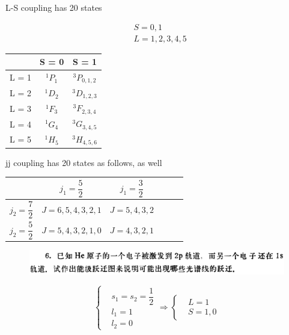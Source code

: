 \documentclass{article}
\begin{document}
L-S coupling has 20 states

\begin{equation*}
  \begin{aligned}
    & S = 0,1 \\
    & L = 1,2,3,4,5
  \end{aligned}
\end{equation*}

\begin{center}
\begin{tabular}{ c|cc } 
        & S = 0 & S = 1 \\
  \hline
  L = 1 & ${}^{1}P_{1}$ & ${}^{3}P_{0,1,2}$ \\ 
  L = 2 & ${}^{1}D_{2}$ & ${}^{3}D_{1,2,3}$ \\
  L = 3 & ${}^{1}F_{3}$ & ${}^{3}F_{2,3,4}$ \\
  L = 4 & ${}^{1}G_{4}$ & ${}^{3}G_{3,4,5}$ \\ 
  L = 5 & ${}^{1}H_{5}$ & ${}^{3}H_{4,5,6}$ \\ 
\end{tabular}
\end{center}

jj coupling has 20 states as follows, as well

\begin{center}
\begin{tabular}{ Sc|ScSc } 
        & $j_1 = \dfrac{5}{2} $ & $j_1 = \dfrac{3}{2} $ \\
  \hline
  $j_2 = \dfrac{7}{2} $ & $J = 6,5,4,3,2,1$ & $J = 5,4,3,2$ \\ 
  $j_2 = \dfrac{5}{2} $ & $J = 5,4,3,2,1,0$ & $J = 4,3,2,1$
\end{tabular}
\end{center}

\begin{figure}[H]
  \centering
  \includegraphics[width=\linewidth]{figures/Problem6}
  \label{fig:}
\end{figure}

\begin{equation*}
  \left\{
  \begin{aligned}
    & s_1 = s_2 = \dfrac{1}{2} \\
    & l_1 = 1 \\
    & l_2 = 0
  \end{aligned}
  \right.
  \Rightarrow
  \left\{
  \begin{aligned}
    & L = 1 \\
    & S = 1, 0
  \end{aligned}
  \right.
\end{equation*}
\end{document}
